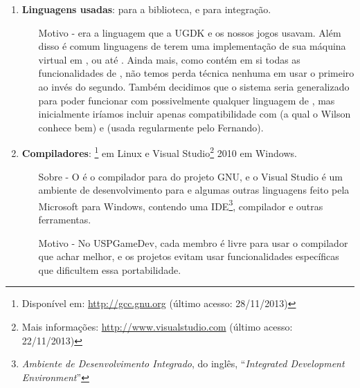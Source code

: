   \begin{enumerate}

    \item \textbf{Linguagens usadas}: \CXX{} para a biblioteca,  e
       para integração.
      \begin{itemize}
        \item[Motivo -]
          \CXX{} era a linguagem que a UGDK e os nossos
          jogos usavam. Além disso é comum linguagens de \script{} terem uma
          implementação de sua máquina virtual em \C{}, ou até \CXX{}. Ainda
          mais, como \CXX{} contém em si todas as funcionalidades de \C{},
          não temos perda técnica nenhuma em usar o primeiro ao invés do segundo.
          Também decidimos que o sistema seria generalizado para poder
          funcionar com possivelmente qualquer linguagem de \script{}, mas
          inicialmente iríamos incluir apenas compatibilidade com 
          (a qual o Wilson conhece bem) e  (usada regularmente
          pelo Fernando).
      \end{itemize}

    \item \textbf{Compiladores}: \footnote{Disponível em:
      \url{http://gcc.gnu.org} (último acesso: 28/11/2013)} em Linux e Visual
      Studio\footnote{Mais informações: \url{http://www.visualstudio.com} (último
      acesso: 22/11/2013)} 2010 em Windows.
      \begin{itemize}
        \item[Sobre -]
          O  é o compilador para \CXX{} do projeto GNU, e o Visual Studio
          é um ambiente de desenvolvimento para \CXX{} e algumas outras linguagens
          feito pela Microsoft para Windows, contendo uma
          IDE\footnote{\textit{Ambiente de Desenvolvimento Integrado}, do inglês,
          ``\textit{Integrated Development Environment}''},
          compilador e outras ferramentas.
        \item[Motivo -]
          No USPGameDev, cada membro é livre para usar o compilador que achar melhor,
          e os projetos evitam usar funcionalidades específicas que dificultem
          essa portabilidade.
      \end{itemize}


\end{enumerate}
